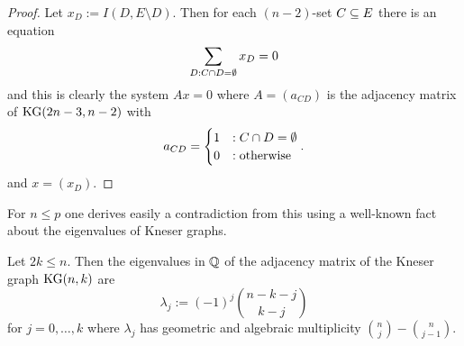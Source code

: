 \begin{proof}
    Let $x_D:=I(D,E\setminus D)$. Then for each $(n-2)$-set $C\subseteq E$ there is an equation
    $$
    \sum_{D:C\cap D=\emptyset}{x_D}=0
    $$
    and this is clearly the system $Ax=0$ where $A=(a_{CD})$ is the adjacency matrix of $\mathop\mathrm{KG}(2n-3,n-2)$ with
    $$
    a_{CD}=
    \begin{cases}
        1 &: C\cap D=\emptyset\\
        0 &: \textrm{otherwise}
    \end{cases}.
    $$
    and $x=(x_D)$.
\end{proof}

For $n\leq p$ one derives easily a contradiction from this using a well-known fact about the eigenvalues of Kneser graphs.

\begin{lemma}
  Let $2k\leq n$. Then the eigenvalues in $\mathbb{Q}$ of the adjacency matrix of the Kneser graph $\mathop\mathrm{KG}(n,k)$ are
  $$
    \lambda_j:={(-1)}^j\binom{n-k-j}{k-j}
  $$
  for $j=0,\ldots,k$ where $\lambda_j$ has geometric and algebraic multiplicity $\binom{n}{j}-\binom{n}{j-1}$.
\end{lemma}

